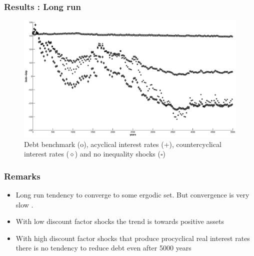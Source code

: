 \documentclass{beamer}
\begin{document}
 
\begin{frame}
 \frametitle{Results : Long run}
 
  \begin{figure}[htp]
 \centering
 \includegraphics[width=\textwidth]{Draft25Graphs/LongSimulations.eps}
 \caption{Debt benchmark (o), acyclical interest rates (+), countercyclical interest rates ($\diamond$) and no inequality shocks \scriptsize ($\square$\normalsize) }
 \label{fig:LongSimulations}
 \end{figure}


 \end{frame}
 
 \begin{frame}[label=main]
  \frametitle{Remarks}
  \begin{itemize}
   \item Long run tendency to converge to some ergodic set. But convergence is very slow
   \hyperlink{convergence}{}.
   \item With low discount factor shocks the trend is towards positive assets
   \item With high discount factor shocks that produce procyclical real interest rates there is no tendency to reduce debt even after 5000 years
  \end{itemize}

 \end{frame}
\end{document}

